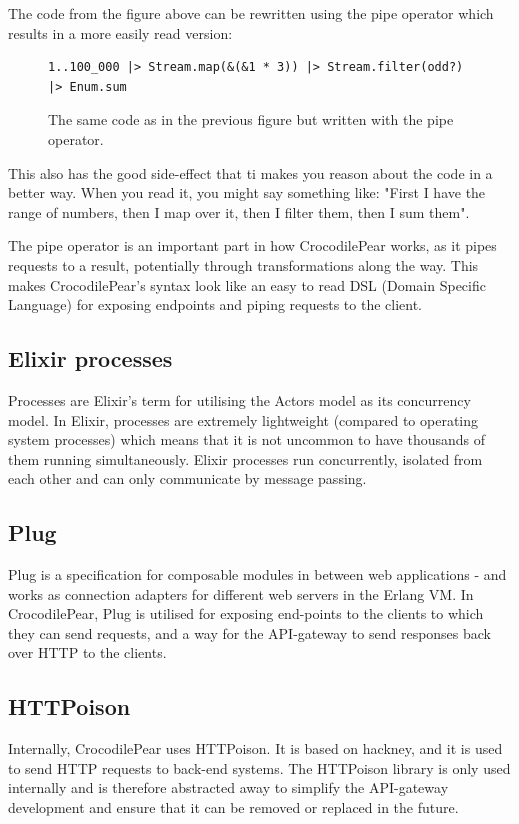 \documentclass{cslthse-msc}
\begin{document}
The code from the figure above can be rewritten using the pipe operator which results in a more easily read version:

\begin{figure}[H]
  \centering
\begin{lstlisting}[breaklines=true,frame=single]
1..100_000 |> Stream.map(&(&1 * 3)) |> Stream.filter(odd?) |> Enum.sum
\end{lstlisting}
  \caption{The same code as in the previous figure but written with the pipe operator.}
\end{figure}

This also has the good side-effect that ti makes you reason about the code in a better way. When you read it, you might say something like: "First I have the range of numbers, then I map over it, then I filter them, then I sum them".

The pipe operator is an important part in how CrocodilePear works, as it pipes requests to a result, potentially through transformations along the way. This makes CrocodilePear's syntax look like an easy to read DSL (Domain Specific Language) for exposing endpoints and piping requests to the client.

\subsection{Elixir processes}
Processes are Elixir's term for utilising the Actors model as its concurrency model. In Elixir, processes are extremely lightweight (compared to operating system processes) which means that it is not uncommon to have thousands of them running simultaneously. Elixir processes run concurrently, isolated from each other and can only communicate by message passing\cite{elixir_processes}.

\subsection{Plug}
Plug is a specification for composable modules in between web applications - and works as connection adapters for different web servers in the Erlang VM\cite{plug}. In CrocodilePear, Plug is utilised for exposing end-points to the clients to which they can send requests, and a way for the API-gateway to send responses back over HTTP to the clients.

\subsection{HTTPoison}
Internally, CrocodilePear uses HTTPoison\cite{httpoison}. It is based on hackney\cite{hackney}, and it is used to send HTTP requests to back-end systems. The HTTPoison library is only used internally and is therefore abstracted away to simplify the API-gateway development and ensure that it can be removed or replaced in the future.
\end{document}
